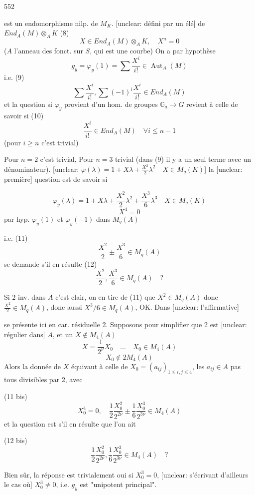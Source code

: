 \newpage


552

est un endomorphisme nilp. de $M_K$.
[unclear: défini par un élé] de $End_A(M)\otimes_A K$
(8) $$X \in End_A(M)\otimes_A K, \quad X^n = 0$$
($A$ l'anneau des fonct. sur $S$, qui est une courbe)
On a par hypothèse
$$g_y = \varphi_y(1) = \sum \frac{X^i}{i!} \in \operatorname{Aut}_A(M)$$
i.e.
(9) $$\sum \frac{X^i}{i!}, \sum (-1)^i \frac{X^i}{i!} \in End_A(M)$$
et la question si $\varphi_y$ provient d'un
hom. de groupes $\mathbb{G}_a \to G$ revient
à celle de savoir si
(10) $$\frac{X^i}{i!} \in End_A(M) \quad \forall i \le n-1$$
(pour $i \ge n$ c'est trivial)

Pour $n=2$ c'est trivial, Pour $n=3$ trivial
(dans (9) il y a un seul terme avec un dénominateur).
[unclear: $\varphi(\lambda) = 1 + X\lambda + \frac{X^2}{2}\lambda^2 \quad X \in M_q(K)$]
la [unclear: première] question est de savoir si

$$\varphi_y(\lambda) = 1 + X \lambda + \frac{X^2}{2} \lambda^2 + \frac{X^3}{6} \lambda^3 \quad X \in M_q(K)$$
$$X^4 = 0$$
par hyp. $\varphi_y(1)$ et $\varphi_y(-1)$ dans $M_q(A)$

i.e.
(11) $$\frac{X^2}{2} \pm \frac{X^3}{6} \in M_q(A)$$
se demande s'il en résulte
(12) $$\frac{X^2}{2}, \frac{X^3}{6} \in M_q(A) \quad ?$$

Si $2$ inv. dans $A$ c'est clair, on en tire
de (11) que $X^2 \in M_q(A)$ donc $\frac{X^2}{2} \in M_q(A)$,
donc aussi $X^3/6 \in M_q(A)$, OK. Dans [unclear: l'affirmative]

\newpage


se présente ici en car. résiduelle 2. Supposons
pour simplifier que 2 est [unclear: régulier dans] $A$, et un $X \notin M_4(A)$
$$X = \frac{1}{2^\nu} X_0 \quad \dots \quad X_0 \in M_4(A)$$
$$X_0 \notin 2 M_4(A)$$
Alors la donnée de $X$ équivaut à celle de
$X_0 = (a_{ij})_{1 \le i,j \le 4}$, les $a_{ij} \in A$ pas tous
divisibles par 2, avec

(11 bis) $$X_0^4 = 0, \quad \frac{1}{2} \frac{X_0^2}{2^{2\nu}} \pm \frac{1}{6} \frac{X_0^3}{2^{3\nu}} \in M_4(A)$$
et la question est s'il en résulte que l'on ait

(12 bis) $$\frac{1}{2} \frac{X_0^2}{2^{2\nu}} , \frac{1}{6} \frac{X_0^3}{2^{3\nu}} \in M_4(A) \quad ?$$

Bien sûr, la réponse est trivialement oui
si $X_0^3 = 0$, [unclear: s'écrivant d'ailleurs le cas où]
$X_0^3 \neq 0$, i.e. $g_y$ est "unipotent principal".

